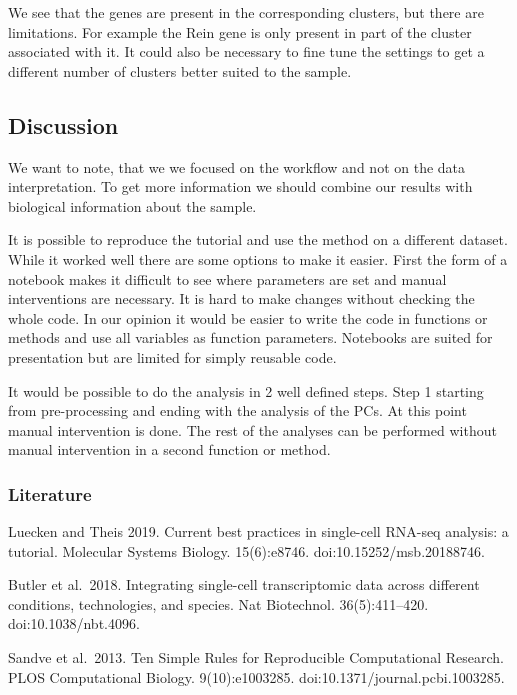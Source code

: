 We see that the genes are present in the corresponding clusters, but
there are limitations. For example the Rein gene is only present in part
of the cluster associated with it. It could also be necessary to fine
tune the settings to get a different number of clusters better suited to
the sample.

\hypertarget{discussion}{%
\subsection{Discussion}\label{discussion}}

We want to note, that we we focused on the workflow and not on the data
interpretation. To get more information we should combine our results
with biological information about the sample.

It is possible to reproduce the tutorial and use the method on a
different dataset. While it worked well there are some options to make
it easier. First the form of a notebook makes it difficult to see where
parameters are set and manual interventions are necessary. It is hard to
make changes without checking the whole code. In our opinion it would be
easier to write the code in functions or methods and use all variables
as function parameters. Notebooks are suited for presentation but are
limited for simply reusable code.

It would be possible to do the analysis in 2 well defined steps. Step 1
starting from pre-processing and ending with the analysis of the PCs. At
this point manual intervention is done. The rest of the analyses can be
performed without manual intervention in a second function or method.

\hypertarget{literature}{%
\subsubsection{Literature}\label{literature}}

Luecken and Theis 2019. Current best practices in single-cell RNA-seq
analysis: a tutorial. Molecular Systems Biology. 15(6):e8746.
doi:10.15252/msb.20188746.

Butler et al.~2018. Integrating single-cell transcriptomic data across
different conditions, technologies, and species. Nat Biotechnol.
36(5):411--420. doi:10.1038/nbt.4096.

Sandve et al.~2013. Ten Simple Rules for Reproducible Computational
Research. PLOS Computational Biology. 9(10):e1003285.
doi:10.1371/journal.pcbi.1003285.
